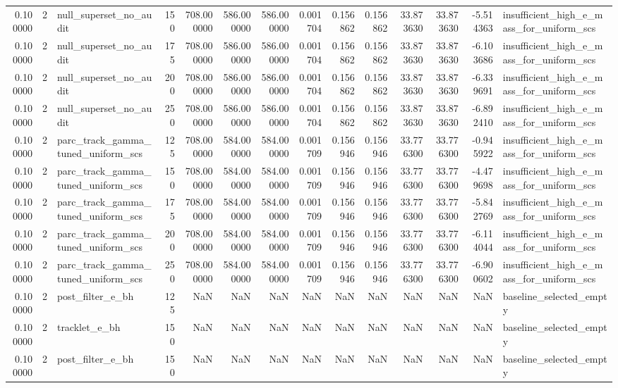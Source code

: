 \begin{tabular}{rrlrrrrrrrrrrl}
0.100000 & 2 & null_superset_no_audit & 150 & 708.000000 & 586.000000 & 586.000000 & 0.001704 & 0.156862 & 0.156862 & 33.873630 & 33.873630 & -5.514363 & insufficient_high_e_mass_for_uniform_scs \\
0.100000 & 2 & null_superset_no_audit & 175 & 708.000000 & 586.000000 & 586.000000 & 0.001704 & 0.156862 & 0.156862 & 33.873630 & 33.873630 & -6.103686 & insufficient_high_e_mass_for_uniform_scs \\
0.100000 & 2 & null_superset_no_audit & 200 & 708.000000 & 586.000000 & 586.000000 & 0.001704 & 0.156862 & 0.156862 & 33.873630 & 33.873630 & -6.339691 & insufficient_high_e_mass_for_uniform_scs \\
0.100000 & 2 & null_superset_no_audit & 250 & 708.000000 & 586.000000 & 586.000000 & 0.001704 & 0.156862 & 0.156862 & 33.873630 & 33.873630 & -6.892410 & insufficient_high_e_mass_for_uniform_scs \\
0.100000 & 2 & parc_track_gamma_tuned_uniform_scs & 125 & 708.000000 & 584.000000 & 584.000000 & 0.001709 & 0.156946 & 0.156946 & 33.776300 & 33.776300 & -0.945922 & insufficient_high_e_mass_for_uniform_scs \\
0.100000 & 2 & parc_track_gamma_tuned_uniform_scs & 150 & 708.000000 & 584.000000 & 584.000000 & 0.001709 & 0.156946 & 0.156946 & 33.776300 & 33.776300 & -4.479698 & insufficient_high_e_mass_for_uniform_scs \\
0.100000 & 2 & parc_track_gamma_tuned_uniform_scs & 175 & 708.000000 & 584.000000 & 584.000000 & 0.001709 & 0.156946 & 0.156946 & 33.776300 & 33.776300 & -5.842769 & insufficient_high_e_mass_for_uniform_scs \\
0.100000 & 2 & parc_track_gamma_tuned_uniform_scs & 200 & 708.000000 & 584.000000 & 584.000000 & 0.001709 & 0.156946 & 0.156946 & 33.776300 & 33.776300 & -6.114044 & insufficient_high_e_mass_for_uniform_scs \\
0.100000 & 2 & parc_track_gamma_tuned_uniform_scs & 250 & 708.000000 & 584.000000 & 584.000000 & 0.001709 & 0.156946 & 0.156946 & 33.776300 & 33.776300 & -6.900602 & insufficient_high_e_mass_for_uniform_scs \\
0.100000 & 2 & post_filter_e_bh & 125 & NaN & NaN & NaN & NaN & NaN & NaN & NaN & NaN & NaN & baseline_selected_empty \\
0.100000 & 2 & tracklet_e_bh & 150 & NaN & NaN & NaN & NaN & NaN & NaN & NaN & NaN & NaN & baseline_selected_empty \\
0.100000 & 2 & post_filter_e_bh & 150 & NaN & NaN & NaN & NaN & NaN & NaN & NaN & NaN & NaN & baseline_selected_empty \\

\end{tabular}
